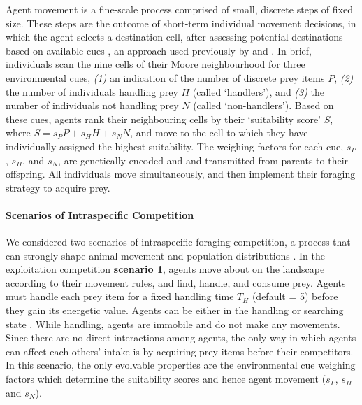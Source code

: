     Agent movement is a fine-scale process comprised of small, discrete steps of fixed size.
    These steps are the outcome of short-term individual movement decisions, in which the agent selects a destination cell, after assessing potential destinations based on available cues \citep[similar to step selection or resource selection][]{fortin2005,manly2007}, an approach used previously by \cite{getz2015} and \cite{white2018}.
    In brief, individuals scan the nine cells of their Moore neighbourhood for three environmental cues, \textit{(1)} an indication of the number of discrete prey items $P$, \textit{(2)} the number of individuals handling prey $H$ (called `handlers'), and \textit{(3)} the number of individuals not handling prey $N$ (called `non-handlers').
    Based on these cues, agents rank their neighbouring cells by their `suitability score' $S$, where $S = s_PP + s_HH + s_NN$, and move to the cell to which they have individually assigned the highest suitability.
    The weighing factors for each cue, $s_P$, $s_H$, and $s_N$, are genetically encoded and and transmitted from parents to their offspring.
    All individuals move simultaneously, and then implement their foraging strategy to acquire prey.
    
    \paragraph*{Scenarios of Intraspecific Competition}
    
    We considered two scenarios of intraspecific foraging competition, a process that can strongly shape animal movement and population distributions \citep{fretwell1970,parker1978}.
    In the exploitation competition \textbf{scenario 1}, agents move about on the landscape according to their movement rules, and find, handle, and consume prey.
    Agents must handle each prey item for a fixed handling time $T_H$ (default = 5) before they gain its energetic value.
    Agents can be either in the handling or searching state \citep{holmgren1995}.
    While handling, agents are immobile and do not make any movements.
    Since there are no direct interactions among agents, the only way in which agents can affect each others' intake is by acquiring prey items before their competitors.
    In this scenario, the only evolvable properties are the environmental cue weighing factors which determine the suitability scores and hence agent movement ($s_P$, $s_H$ and $s_N$).
    
